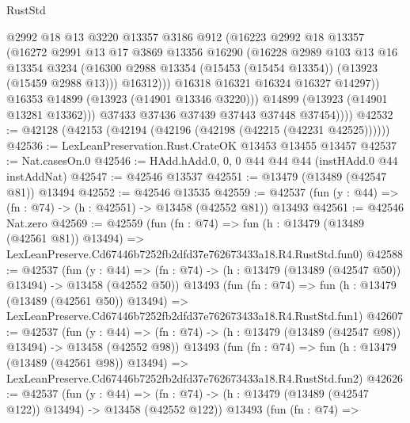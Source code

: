 \begin{lexlean}{RustStd}
\begin{coremodule}
                    @2992
                    @18
                    @13
                    @3220
                    @13357
                    @3186
                    @912
                    (@16223
                      @2992
                      @18
                      @13357
                      (@16272
                        @2991
                        @13
                        @17
                        @3869
                        @13356
                        @16290
                        (@16228
                          @2989
                          @103
                          @13
                          @16
                          @13354
                          @3234
                          (@16300 @2988 @13354 (@15453 (@15454 @13354)) (@13923 (@15459 @2988 @13)))
                          @16312)))
                    @16318
                    @16321
                    @16324
                    @16327
                    @14297))
                @16353
                @14899
                (@13923 (@14901 @13346 @3220)))
              @14899
              (@13923 (@14901 @13281 @13362)))
            @37433
            @37436
            @37439
            @37443
            @37448
            @37454))))
@42532 := @42128 (@42153 (@42194 (@42196 (@42198 (@42215 (@42231 @42525))))))
@42536 := LexLeanPreservation.Rust.CrateOK @13453 @13455 @13457
@42537 := Nat.casesOn.{0}
@42546 := HAdd.hAdd.{0, 0, 0} @44 @44 @44 (instHAdd.{0} @44 instAddNat)
@42547 := @42546 @13537
@42551 := @13479 (@13489 (@42547 @81)) @13494
@42552 := @42546 @13535
@42559 := @42537 (fun (y : @44) => (fn : @74) -> (h : @42551) -> @13458 (@42552 @81)) @13493
@42561 := @42546 Nat.zero
@42569 := @42559
    (fun (fn : @74) =>
    fun (h : @13479 (@13489 (@42561 @81)) @13494) =>
    LexLeanPreserve.Cd67446b7252fb2dfd37e762673433a18.R4.RustStd.fun0)
@42588 := @42537
    (fun (y : @44) =>
    (fn : @74) -> (h : @13479 (@13489 (@42547 @50)) @13494) -> @13458 (@42552 @50))
    @13493
    (fun (fn : @74) =>
    fun (h : @13479 (@13489 (@42561 @50)) @13494) =>
    LexLeanPreserve.Cd67446b7252fb2dfd37e762673433a18.R4.RustStd.fun1)
@42607 := @42537
    (fun (y : @44) =>
    (fn : @74) -> (h : @13479 (@13489 (@42547 @98)) @13494) -> @13458 (@42552 @98))
    @13493
    (fun (fn : @74) =>
    fun (h : @13479 (@13489 (@42561 @98)) @13494) =>
    LexLeanPreserve.Cd67446b7252fb2dfd37e762673433a18.R4.RustStd.fun2)
@42626 := @42537
    (fun (y : @44) =>
    (fn : @74) -> (h : @13479 (@13489 (@42547 @122)) @13494) -> @13458 (@42552 @122))
    @13493
    (fun (fn : @74) =>

\end{coremodule}
\end{lexlean}
